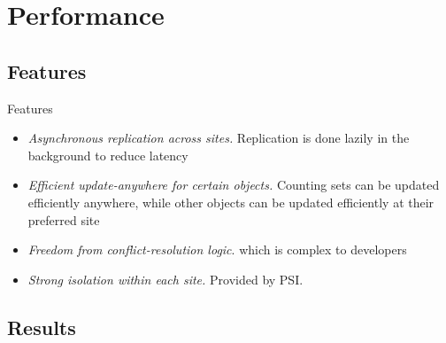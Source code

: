 \documentclass{beamer}
\begin{document}
\section{Performance}

	\subsection{Features}
	
	\begin{frame}{Features}
	
		\begin{itemize}
		\item \textit{Asynchronous replication across sites.} Replication is done lazily in the background to reduce latency
		\item \textit{Efficient update-anywhere for certain objects.} Counting sets can be updated efficiently anywhere, while other objects can be updated efficiently at their preferred site
		\item \textit{Freedom from conflict-resolution logic}. which is complex to developers
		\item \textit{Strong isolation within each site.} Provided by PSI.
		\end{itemize}
	\end{frame}

	\subsection{Results}	
\end{document}

